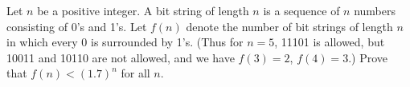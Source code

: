 Let $n$ be a positive integer. A bit string of length $n$ is a sequence of $n$
numbers consisting of 0's and 1's. Let $f(n)$ denote the number of bit strings
of length $n$ in which every 0 is surrounded by 1's. (Thus for $n = 5$, 11101
is allowed, but 10011 and 10110 are not allowed, and we have $f(3) = 2$, $f(4)
= 3$.) Prove that $f(n) < (1.7)^n$ for all $n$.
